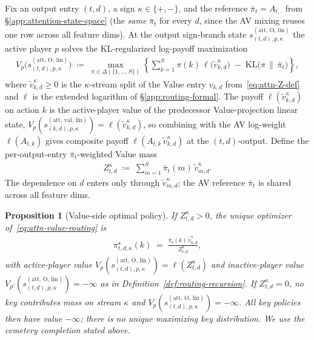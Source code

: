 \documentclass[twoside]{article}
\newcommand{\1}{\mathbf{1}}
\newtheorem{proposition}{Proposition}
\begin{document}
Fix an output entry $(t, d)$, a sign $\kappa \in \{+,-\}$, and the reference $\bar\pi_t =
    A_{t,\cdot}$ from \S\ref{app:attention-state-space} (the \emph{same} $\bar\pi_t$ for every $d$,
since the AV mixing reuses one row across all feature dims). At the output sign-branch state
$s_{(t,d),p,\kappa}^{(\mathrm{att},\,\mathrm{O},\,\mathrm{lin})}$ the active player $p$ solves the
KL-regularized log-payoff maximization
\begin{align}\label{eq:attn-value-routing}
    V_p\!\bigl(s_{(t,d),p,\kappa}^{(\mathrm{att},\,\mathrm{O},\,\mathrm{lin})}\bigr)
    \;\coloneqq\;
    \max_{\pi \in \Delta(\{1,\dots,S\})}
    \left\{
    \sum_{k=1}^S \pi(k)\, \ell\!\bigl(\tilde{v}_{k,d}^\kappa\bigr)
    \;-\;
    \mathrm{KL}\!\bigl(\pi \,\|\, \bar\pi_t\bigr)
    \right\},
\end{align}
where $\tilde{v}_{k,d}^\kappa \ge 0$ is the $\kappa$-stream split of the Value entry $v_{k,d}$
from~\eqref{eq:attn-Z-def} and $\ell$ is the extended logarithm of \S\ref{app:routing-formal}. The
payoff $\ell(\tilde{v}_{k,d}^\kappa)$ on action $k$ is the active-player value of the predecessor
Value-projection linear state,
$V_p(s_{(k,d),p,\kappa}^{(\mathrm{att},\,\mathrm{val},\,\mathrm{lin})}) =
    \ell(\tilde{v}_{k,d}^\kappa)$, so combining with the AV log-weight $\ell(A_{t,k})$ gives composite
payoff $\ell(A_{t,k}\, \tilde{v}_{k,d}^\kappa)$ at the $(t,d)$-output. Define the per-output-entry
$\bar\pi_t$-weighted Value mass
\begin{align}\label{eq:attn-z-def}
    Z_{t,d}^\kappa \;\coloneqq\; \sum_{m=1}^S \bar\pi_t(m)\, \tilde{v}_{m,d}^\kappa.
\end{align}
The dependence on $d$ enters only through $\tilde{v}_{m,d}^\kappa$; the AV reference $\bar\pi_t$ is
shared across all feature dims.

\begin{proposition}[Value-side optimal policy]\label{prop:attn-value-policy}
If $Z_{t,d}^\kappa > 0$, the unique optimizer of~\eqref{eq:attn-value-routing} is
\begin{align}\label{eq:attn-value-policy}
    \pi_{t,d,\kappa}^\star(k)
    \;=\;
    \frac{\bar\pi_t(k)\, \tilde{v}_{k,d}^\kappa}{Z_{t,d}^\kappa},
\end{align}
with active-player value $V_p(s_{(t,d),p,\kappa}^{(\mathrm{att},\,\mathrm{O},\,\mathrm{lin})}) =
    \ell(Z_{t,d}^\kappa)$ and inactive-player value
$V_{p'}(s_{(t,d),p,\kappa}^{(\mathrm{att},\,\mathrm{O},\,\mathrm{lin})}) = -\infty$ as in
Definition~\ref{def:routing-recursion}. If $Z_{t,d}^\kappa = 0$, no key contributes mass on stream
$\kappa$ and $V_p(s_{(t,d),p,\kappa}^{(\mathrm{att},\,\mathrm{O},\,\mathrm{lin})}) = -\infty$. All key policies then have value $-\infty$;
there is no unique maximizing key distribution. We use the cemetery completion stated above.
\end{proposition}
\end{document}
